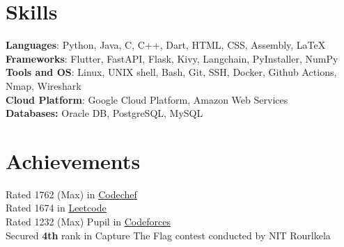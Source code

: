 
\resumeSubHeadingListEnd

%
\vspace{-10px}
\section{Skills}
\begin{itemize}[leftmargin=0.15in, label={}]
  \small{\item{
        \textbf{Languages}{: Python, Java, C, C++, Dart, HTML, CSS, Assembly, LaTeX} \\
        \textbf{Frameworks}{: Flutter, FastAPI, Flask, Kivy, Langchain, PyInstaller, NumPy} \\
        \textbf{Tools and OS}{: Linux, UNIX shell, Bash, Git, SSH, Docker, Github Actions, Nmap, Wireshark} \\
        \textbf{Cloud Platform}{: Google Cloud Platform, Amazon Web Services} \\
        \textbf{Databases: }{Oracle DB, PostgreSQL, MySQL} \\
        }}

\end{itemize}


%
\section{Achievements}
\begin{itemize}[leftmargin=0.15in, label={}]
  \small{\item{
        Rated 1762 (Max) in \href{https://www.codechef.com/users/ashu2909}
        {\underline{Codechef}} \\
        {Rated 1674 in \href{https://leetcode.com/ashu_coderc/}{\underline{Leetcode}}} \\
        Rated 1232 (Max) Pupil in \href{https://codeforces.com/profile/ashucoder}
        {\underline{Codeforces}} \\
        Secured \textbf{4th} rank in Capture The Flag contest conducted by NIT Rourlkela \\
        }}

\end{itemize}
